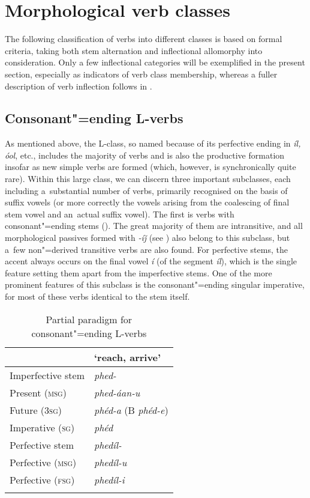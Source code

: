 \section{Morphological verb classes}
\label{sec:8-3}


The following classification of verbs into different classes is based on formal criteria, taking both stem alternation and inflectional allomorphy into consideration. Only a few inflectional categories will be exemplified in the present section, especially as indicators of verb class membership, whereas a fuller description of verb inflection follows in .


\subsection{Consonant"=ending L-verbs}
\label{subsec:8-3-1}


As mentioned above, the L-class, so named because of its perfective ending in \textit{íl, óol}, etc., includes the majority of verbs and is also the productive formation insofar as new simple verbs are formed (which, however, is synchronically quite rare). Within this large class, we can discern three important subclasses, each including a~substantial number of verbs, primarily recognised on the basis of suffix vowels (or more correctly the vowels arising from the coalescing of final stem vowel and an~actual suffix vowel). The first is verbs with consonant"=ending stems (). The great majority of them are intransitive, and all morphological passives formed with \textit{-íǰ} (see ) also belong to this subclass, but a~few non"=derived transitive verbs are also found. For perfective stems, the accent always occurs on the final vowel \textit{í} (of the segment \textit{íl}), which is the single feature setting them apart from the imperfective stems. One of the more prominent features of this subclass is the consonant"=ending singular imperative, for most of these verbs identical to the stem itself.


\begin{table}[ht]
\caption{Partial paradigm for consonant"=ending L-verbs}
\begin{tabularx}{.75\textwidth}{ Q Q }
\lsptoprule
&
`reach, arrive'\\\midrule
Imperfective stem &
\textit{phed-} \\
Present (\textsc{msg}) &
\textit{phed-áan-u} \\
Future (\textsc{3sg}) &
\textit{phéd-a} (B \textit{phéd-e}) \\
Imperative (\textsc{sg}) &
\textit{phéd} \\
Perfective stem &
\textit{phedíl-} \\
Perfective (\textsc{msg}) &
\textit{phedíl-u} \\
Perfective (\textsc{fsg}) &
\textit{phedíl-i} \\\lspbottomrule
\end{tabularx}
\label{tab:8-4}
\end{table}

